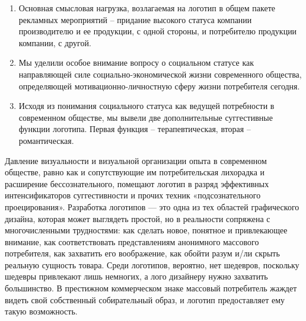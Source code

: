 \begin{enumerate}
\item Основная смысловая нагрузка, возлагаемая на логотип в общем пакете
  рекламных мероприятий -- придание высокого статуса компании производителю и
  ее продукции, с одной стороны, и потребителю продукции компании, с другой.
\item Мы уделили особое внимание вопросу о социальном статусе как
  направляющей силе социально-экономической жизни современного общества,
  определяющей мотивационно-личностную сферу жизни потребителя сегодня.
\item Исходя из понимания социального статуса как ведущей потребности в
  современном обществе, мы вывели две дополнительные суггестивные функции
  логотипа. Первая функция -- терапевтическая, вторая -- романтическая.
\end{enumerate}

Давление визуальности и визуальной организации опыта в современном обществе, равно как  и сопутствующие им потребительская лихорадка и расширение бессознательного, помещают логотип в разряд эффективных интенсификаторов суггестивности и прочих техник «подсознательного проецирования». Разработка логотипов — это  одна из тех областей графического дизайна, которая может выглядеть простой, но в реальности сопряжена с многочисленными трудностями: как сделать новое, понятное и привлекающее внимание, как соответствовать представлениям анонимного массового потребителя, как захватить его воображение, как обойти разум и/ли скрыть реальную сущность товара. Среди логотипов, вероятно, нет шедевров, поскольку шедевры привлекают лишь немногих, а лого дизайнеру нужно захватить большинство.  В престижном коммерческом знаке массовый потребитель жаждет видеть свой собственный собирательный образ, и логотип предоставляет ему такую возможность.

